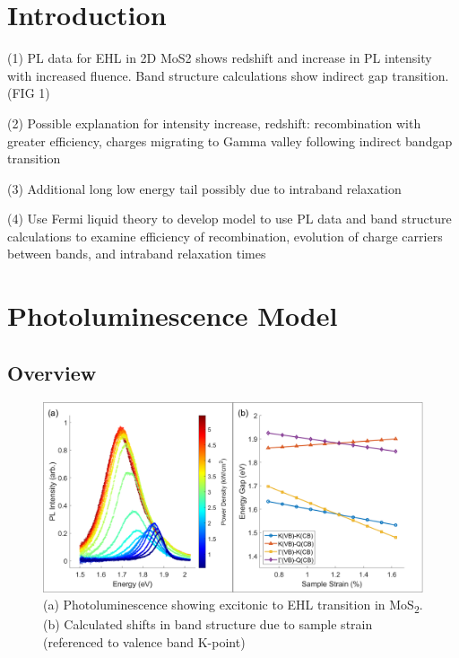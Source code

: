 \documentclass[aps,prb,preprint,groupedaddress]{revtex4-2}
\begin{document}
\maketitle

\section{Introduction\label{Intro}}


(1) PL data for EHL in 2D MoS2 shows redshift and increase in PL intensity with increased fluence. Band structure calculations show indirect gap transition. (FIG 1)

(2) Possible explanation for intensity increase, redshift: recombination with greater efficiency, charges migrating to Gamma valley following indirect bandgap transition

(3) Additional long low energy tail possibly due to intraband relaxation

(4) Use Fermi liquid theory to develop model to use PL data and band structure calculations to examine efficiency of recombination, evolution of charge carriers between bands, and intraband relaxation times





\section{Photoluminescence Model}

\subsection{Overview}

\begin{figure}[H]
	\includegraphics[width=0.95\linewidth]{fig_fig1.png}
	\caption{(a) Photoluminescence showing excitonic to EHL transition in MoS\textsubscript{2}. (b) Calculated shifts in band structure due to sample strain (referenced to valence band K-point)}
	\label{fig:schematic}
\end{figure}
\end{document}
